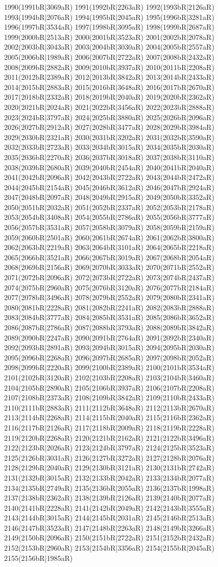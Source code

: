 1990(1991bR|3069aR) 1991(1992bR|2263aR) 1992(1993bR|2126aR) 1993(1994bR|2076aR) 1994(1995bR|2045aR) 1995(1996bR|3281aR) 1996(1997bR|3534aR) 1997(1998bR|3095aR) 1998(1999bR|2687aR) 1999(2000bR|2513aR) 2000(2001bR|3523aR) 2001(2002bR|2078aR) 2002(2003bR|3043aR) 2003(2004bR|3030aR) 2004(2005bR|2557aR) 2005(2006bR|1989aR) 2006(2007bR|2722aR) 2007(2008bR|2432aR) 2008(2009bR|2882aR) 2009(2010bR|3937aR) 2010(2011bR|2208aR) 2011(2012bR|2389aR) 2012(2013bR|3842aR) 2013(2014bR|2433aR) 2014(2015bR|2883aR) 2015(2016bR|3648aR) 2016(2017bR|2670aR) 2017(2018bR|2332aR) 2018(2019bR|2040aR) 2019(2020bR|2362aR) 2020(2021bR|2024aR) 2021(2022bR|3456aR) 2022(2023bR|2888aR) 2023(2024bR|3797aR) 2024(2025bR|3880aR) 2025(2026bR|2096aR) 2026(2027bR|2912aR) 2027(2028bR|3477aR) 2028(2029bR|3984aR) 2029(2030bR|2321aR) 2030(2031bR|3202aR) 2031(2032bR|3590aR) 2032(2033bR|2723aR) 2033(2034bR|3015aR) 2034(2035bR|2030aR) 2035(2036bR|2270aR) 2036(2037bR|3018aR) 2037(2038bR|3110aR) 2038(2039bR|2680aR) 2039(2040bR|2454aR) 2040(2041bR|2040aR) 2041(2042bR|2096aR) 2042(2043bR|2722aR) 2043(2044bR|2472aR) 2044(2045bR|2154aR) 2045(2046bR|3612aR) 2046(2047bR|2924aR) 2047(2048bR|2097aR) 2048(2049bR|2915aR) 2049(2050bR|3352aR) 2050(2051bR|2032aR) 2051(2052bR|2337aR) 2052(2053bR|2178aR) 2053(2054bR|3408aR) 2054(2055bR|2786aR) 2055(2056bR|3777aR) 2056(2057bR|3531aR) 2057(2058bR|3079aR) 2058(2059bR|2159aR) 2059(2060bR|2501aR) 2060(2061bR|2674aR) 2061(2062bR|3800aR) 2062(2063bR|2219aR) 2063(2064bR|3101aR) 2064(2065bR|2218aR) 2065(2066bR|3521aR) 2066(2067bR|3019aR) 2067(2068bR|2054aR) 2068(2069bR|2156aR) 2069(2070bR|3033aR) 2070(2071bR|2552aR) 2071(2072bR|2096aR) 2072(2073bR|2722aR) 2073(2074bR|2437aR) 2074(2075bR|2960aR) 2075(2076bR|3120aR) 2076(2077bR|2184aR) 2077(2078bR|3496aR) 2078(2079bR|2552aR) 2079(2080bR|2341aR) 2080(2081bR|2228aR) 2081(2082bR|2241aR) 2082(2083bR|2888aR) 2083(2084bR|3777aR) 2084(2085bR|3531aR) 2085(2086bR|3652aR) 2086(2087bR|2786aR) 2087(2088bR|3793aR) 2088(2089bR|3842aR) 2089(2090bR|2247aR) 2090(2091bR|2764aR) 2091(2092bR|2340aR) 2092(2093bR|2891aR) 2093(2094bR|3015aR) 2094(2095bR|2030aR) 2095(2096bR|2268aR) 2096(2097bR|2685aR) 2097(2098bR|2052aR) 2098(2099bR|2220aR) 2099(2100bR|2389aR) 2100(2101bR|3534aR) 2101(2102bR|3120aR) 2102(2103bR|2208aR) 2103(2104bR|3460aR) 2104(2105bR|2890aR) 2105(2106bR|3937aR) 2106(2107bR|2208aR) 2107(2108bR|2373aR) 2108(2109bR|3842aR) 2109(2110bR|2433aR) 2110(2111bR|2883aR) 2111(2112bR|3648aR) 2112(2113bR|2670aR) 2113(2114bR|2268aR) 2114(2115bR|2040aR) 2115(2116bR|2362aR) 2116(2117bR|2126aR) 2117(2118bR|2009aR) 2118(2119bR|2228aR) 2119(2120bR|2268aR) 2120(2121bR|2162aR) 2121(2122bR|3496aR) 2122(2123bR|2026aR) 2123(2124bR|3797aR) 2124(2125bR|3523aR) 2125(2126bR|3031aR) 2126(2127bR|3272aR) 2127(2128bR|2076aR) 2128(2129bR|2040aR) 2129(2130bR|3121aR) 2130(2131bR|2742aR) 2131(2132bR|3015aR) 2132(2133bR|2042aR) 2133(2134bR|2077aR) 2134(2135bR|2749aR) 2135(2136bR|2055aR) 2136(2137bR|1998aR) 2137(2138bR|2362aR) 2138(2139bR|2126aR) 2139(2140bR|2077aR) 2140(2141bR|2228aR) 2141(2142bR|2049aR) 2142(2143bR|3555aR) 2143(2144bR|3015aR) 2144(2145bR|2031aR) 2145(2146bR|2513aR) 2146(2147bR|3523aR) 2147(2148bR|2263aR) 2148(2149bR|3266aR) 2149(2150bR|2096aR) 2150(2151bR|2722aR) 2151(2152bR|2432aR) 2152(2153bR|2960aR) 2153(2154bR|3356aR) 2154(2155bR|2045aR) 2155(2156bR|1985aR) 